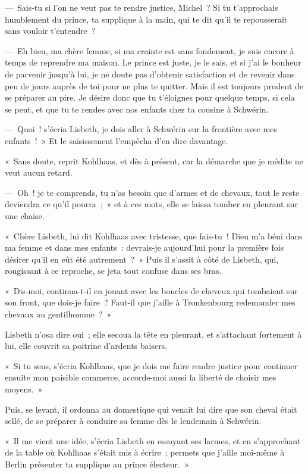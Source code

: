 \documentclass[french,twoside]{book} %
\begin{document}
— Sais-tu si l’on ne veut pas te rendre justice, Michel ? Si tu t’approchais humblement du prince, ta supplique à la main, qui te dit qu’il te repousserait sans vouloir t’entendre ?\par
— Eh bien, ma chère femme, si ma crainte est sans fondement, je suis encore à temps de reprendre ma maison. Le prince est juste, je le sais, et si j’ai le bonheur de parvenir jusqu’à lui, je ne doute pas d’obtenir satisfaction et de revenir dans peu de jours auprès de toi pour ne plus te quitter. Mais il est toujours prudent de se préparer au pire. Je désire donc que tu t’éloignes pour quelque temps, si cela se peut, et que tu te rendes avec nos enfants chez ta cousine à Schwérin.\par
— Quoi ! s’écria Lisbeth, je dois aller à Schwérin sur la frontière avec mes enfants ! » Et le saisissement l’empêcha d’en dire davantage.\par
« Sans doute, reprit Kohlhaas, et dès à présent, car la démarche que je médite ne veut aucun retard.\par
— Oh ! je te comprends, tu n’as besoin que d’armes et de chevaux, tout le reste deviendra ce qu’il pourra ; » et à ces mots, elle se laissa tomber en pleurant sur une chaise.\par
« Chère Lisbeth, lui dit Kohlhaas avec tristesse, que fais-tu ! Dieu m’a béni dans ma femme et dans mes enfants : devrais-je aujourd’hui pour la première fois désirer qu’il en eût été autrement ? » Puis il s’assit à côté de Lisbeth, qui, rougissant à ce reproche, se jeta tout confuse dans ses bras.\par
« Dis-moi, continua-t-il en jouant avec les boucles de cheveux qui tombaient sur son front, que dois-je faire ? Faut-il que j’aille à Tronkenbourg redemander mes chevaux au gentilhomme ? »\par
Lisbeth n’osa dire oui ; elle secoua la tête en pleurant, et s’attachant fortement à lui, elle couvrit sa poitrine d’ardents baisers.\par
« Si tu sens, s’écria Kohlhaas, que je dois me faire rendre justice pour continuer ensuite mon paisible commerce, accorde-moi aussi la liberté de choisir mes moyens. »\par
Puis, se levant, il ordonna au domestique qui venait lui dire que son cheval était sellé, de se préparer à conduire sa femme dès le lendemain à Schwérin.\par
« Il me vient une idée, s’écria Lisbeth en essuyant ses larmes, et en s’approchant de la table où Kohlhaas s’était mis à écrire ; permets que j’aille moi-même à Berlin présenter ta supplique au prince électeur. »\par
\end{document}
